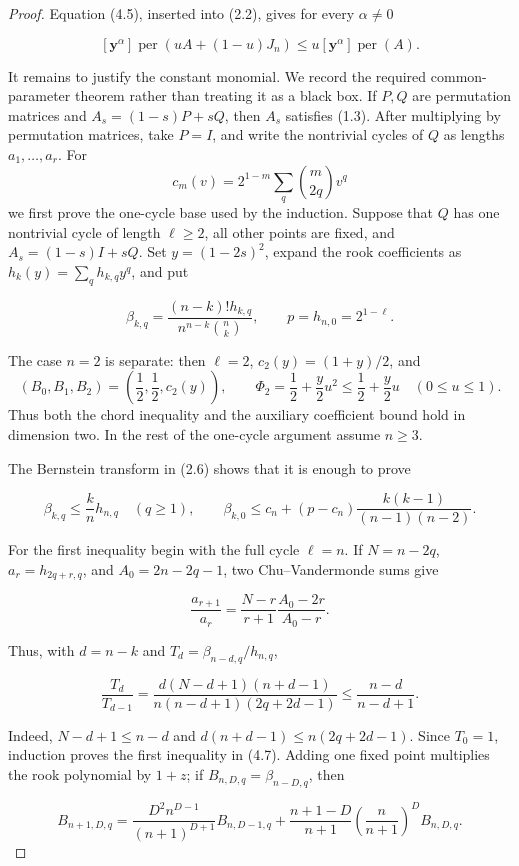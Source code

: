 \documentclass[11pt]{article}
\begin{document}
\begin{proof}
Equation (4.5), inserted into (2.2), gives for every $\alpha\ne0$

\[
[\mathbf y^\alpha]\operatorname{per}(uA+(1-u)J_n)
\le u[\mathbf y^\alpha]\operatorname{per}(A). \tag{4.6}
\]

It remains to justify the constant monomial.  We record the required
common-parameter theorem rather than treating it as a black box.  If
$P,Q$ are permutation matrices and
$A_s=(1-s)P+sQ$, then $A_s$ satisfies (1.3).  After multiplying by
permutation matrices, take $P=I$, and write the nontrivial cycles of
$Q$ as lengths $a_1,\ldots,a_r$.  For
\[
c_m(v)=2^{1-m}\sum_q\binom m{2q}v^q
\]
we first prove the one-cycle base used by the induction.  Suppose that $Q$
has one nontrivial cycle of length $\ell\ge2$, all other points are fixed,
and $A_s=(1-s)I+sQ$.  Set $y=(1-2s)^2$, expand the rook
coefficients as $h_k(y)=\sum_qh_{k,q}y^q$, and put

\[
 \beta_{k,q}=\frac{(n-k)!h_{k,q}}
 {n^{n-k}\binom nk},\qquad p=h_{n,0}=2^{1-\ell}.
\]

The case $n=2$ is separate: then $\ell=2$,
$c_2(y)=(1+y)/2$, and
\[
 (B_0,B_1,B_2)=\left(\frac12,\frac12,c_2(y)\right),
 \qquad
 \Phi_2=\frac12+\frac y2u^2
 \le \frac12+\frac y2u
 \quad(0\le u\le1).
\]
Thus both the chord inequality and the auxiliary coefficient bound hold in
dimension two.  In the rest of the one-cycle argument assume $n\ge3$.

The Bernstein transform in (2.6) shows that it is enough to prove

\[
 \beta_{k,q}\le\frac{k}{n}h_{n,q}\quad(q\ge1),
 \qquad
 \beta_{k,0}\le c_n+(p-c_n)
 \frac{k(k-1)}{(n-1)(n-2)}. \tag{4.7}
\]

For the first inequality begin with the full cycle $\ell=n$.  If
$N=n-2q$, $a_r=h_{2q+r,q}$, and $A_0=2n-2q-1$,
two Chu--Vandermonde sums give

\[
 \frac{a_{r+1}}{a_r}
 =\frac{N-r}{r+1}\frac{A_0-2r}{A_0-r}.
\]

Thus, with $d=n-k$ and
$T_d=\beta_{n-d,q}/h_{n,q}$,

\[
 \frac{T_d}{T_{d-1}}
 =\frac{d(N-d+1)(n+d-1)}
 {n(n-d+1)(2q+2d-1)}
 \le\frac{n-d}{n-d+1}.
\]

Indeed, $N-d+1\le n-d$ and
$d(n+d-1)\le n(2q+2d-1)$.  Since $T_0=1$, induction proves
the first inequality in (4.7).  Adding one fixed point multiplies the rook
polynomial by $1+z$; if $B_{n,D,q}=\beta_{n-D,q}$, then

\[
 B_{n+1,D,q}=\frac{D^2n^{D-1}}{(n+1)^{D+1}}B_{n,D-1,q}
 +\frac{n+1-D}{n+1}\left(\frac n{n+1}\right)^D B_{n,D,q}.
\]


\end{proof}
\end{document}
